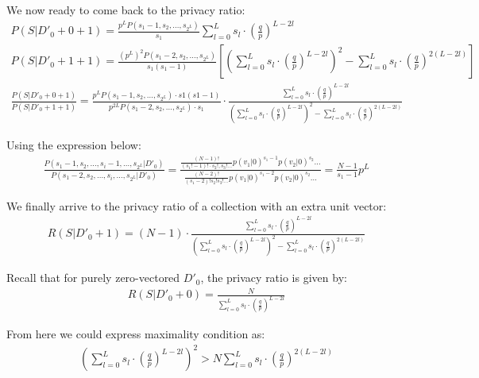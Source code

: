 \documentclass[11pt,draft]{article}
\begin{document}
We now ready to come back to the privacy ratio:
\begin{align}
P(S|D'_0+ 0 + 1) =  \frac{p^LP(s_1-1,s_2,\dots,s_{2^L})}{ s_1 }  \sum_{l=0}^{L} s_l \cdot  \left ( \frac{q}{p} \right )^ {L - 2l} \\
P(S|D'_0+ 1 + 1) =  \frac{(p^L)^2P(s_1-2,s_2,\dots,s_{2^L})}{ s_1(s_1-1) } \left [  \left ( \sum_{l=0}^{L} s_l \cdot  \left ( \frac{q}{p} \right )^ {L - 2l}  \right )^2 -  \sum_{l=0}^{L} s_l \cdot  \left ( \frac{q}{p} \right )^ {2(L - 2l)}  \right ] \\
\frac{P(S|D'_0+ 0 + 1)}{P(S|D'_0+ 1 + 1)} = \frac{p^LP(s_1-1,s_2,\dots,s_{2^L}) \cdot s1(s1-1)}{p^{2L} P(s_1-2,s_2,\dots,s_{2^L}) \cdot s_1} \cdot \frac{ \sum_{l=0}^{L} s_l \cdot  \left ( \frac{q}{p} \right )^ {L - 2l} }{  \left ( \sum_{l=0}^{L} s_l \cdot  \left ( \frac{q}{p} \right )^ {L - 2l}  \right )^2 -  \sum_{l=0}^{L} s_l \cdot  \left ( \frac{q}{p} \right )^ {2(L - 2l)}}
\end{align}

Using the expression below:
\begin{align}
\frac{P(s_1-1,s_2,\dots,s_i-1,\dots,s_{2^L}|D'_0)}{P(s_1-2,s_2,\dots,s_i,\dots,s_{2^L}|D'_0)}  = \frac{ \frac{(N-1)!}{(s_1!-1)!\cdot s_2!, s_3! \dots} p(v_1|0)^{s_1-1} p(v_2|0)^{s_2} \dots  }{ \frac{(N-2)!}{(s_1-2)! s_2! s_3! \dots } p(v_1|0)^{s_1-2} p(v_2|0)^{s_2} \dots} = 
\frac{N-1}{s_1-1} p^L
 \end{align}
 
 We finally arrive to the privacy ratio of a collection with an extra unit vector:
 \begin{align}
 R(S|D'_0 + 1) = (N-1) \cdot \frac{ \sum_{l=0}^{L} s_l \cdot  \left ( \frac{q}{p} \right )^ {L - 2l} }{  \left ( \sum_{l=0}^{L} s_l \cdot  \left ( \frac{q}{p} \right )^ {L - 2l}  \right )^2 -  \sum_{l=0}^{L} s_l \cdot  \left ( \frac{q}{p} \right )^ {2(L - 2l)}}
\end{align}

Recall that for purely zero-vectored $D'_0$, the privacy ratio is given by:
 \begin{align}
 R(S|D'_0 + 0) = \frac{ N} {\sum_{l=0}^{L} s_l \cdot  \left ( \frac{q}{p} \right )^ {L - 2l} }
\end{align}

From here we could express maximality condition as:
 \begin{align}
 \left ( \sum_{l=0}^{L} s_l \cdot  \left ( \frac{q}{p} \right )^ {L - 2l}  \right )^2 > N \sum_{l=0}^{L} s_l \cdot  \left ( \frac{q}{p} \right )^ {2(L - 2l)}
 \end{align}
 
\end{document}
